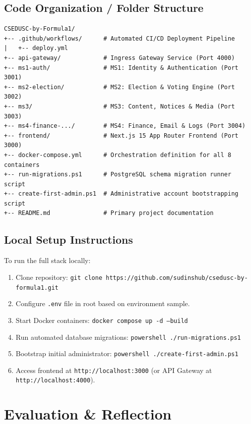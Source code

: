 \documentclass[12pt, a4paper]{article}
\begin{document}
\subsection{Code Organization / Folder Structure}

\begin{lstlisting}[caption={Repository Monorepo Folder Structure}]
CSEDUSC-by-Formula1/
+-- .github/workflows/      # Automated CI/CD Deployment Pipeline
|   +-- deploy.yml
+-- api-gateway/            # Ingress Gateway Service (Port 4000)
+-- ms1-auth/               # MS1: Identity & Authentication (Port 3001)
+-- ms2-election/           # MS2: Election & Voting Engine (Port 3002)
+-- ms3/                    # MS3: Content, Notices & Media (Port 3003)
+-- ms4-finance-.../        # MS4: Finance, Email & Logs (Port 3004)
+-- frontend/               # Next.js 15 App Router Frontend (Port 3000)
+-- docker-compose.yml      # Orchestration definition for all 8 containers
+-- run-migrations.ps1      # PostgreSQL schema migration runner script
+-- create-first-admin.ps1  # Administrative account bootstrapping script
+-- README.md               # Primary project documentation
\end{lstlisting}

\subsection{Local Setup Instructions}
To run the full stack locally:
\begin{enumerate}
    \item Clone repository: \texttt{git clone https://github.com/sudinshub/csedusc-by-formula1.git}
    \item Configure \texttt{.env} file in root based on environment sample.
    \item Start Docker containers: \texttt{docker compose up -d --build}
    \item Run automated database migrations: \texttt{powershell ./run-migrations.ps1}
    \item Bootstrap initial administrator: \texttt{powershell ./create-first-admin.ps1}
    \item Access frontend at \texttt{http://localhost:3000} (or API Gateway at \texttt{http://localhost:4000}).
\end{enumerate}

\section{Evaluation \& Reflection}
\end{document}
